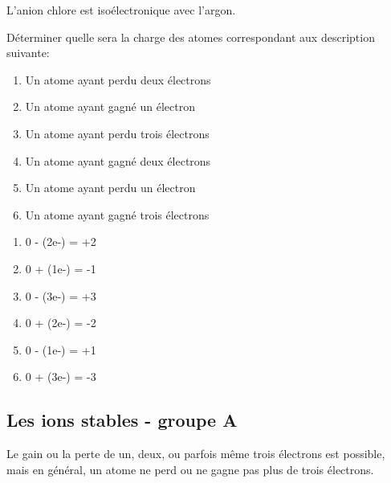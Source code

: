 \documentclass[
  11pt,
  a4paper,
  openany]{book}
\providecommand{\tightlist}{%
  \setlength{\itemsep}{0pt}\setlength{\parskip}{0pt}}
\begin{document}
L'anion chlore est isoélectronique avec l'argon.

\begin{Exercise}

Déterminer quelle sera la charge des atomes correspondant aux description suivante:

\begin{enumerate}
\def\labelenumi{\arabic{enumi}.}
\tightlist
\item
  Un atome ayant perdu deux électrons\\
\item
  Un atome ayant gagné un électron\\
\item
  Un atome ayant perdu trois électrons\\
\item
  Un atome ayant gagné deux électrons\\
\item
  Un atome ayant perdu un électron\\
\item
  Un atome ayant gagné trois électrons
\end{enumerate}

\end{Exercise}

\begin{Answer}

\begin{enumerate}
\def\labelenumi{\arabic{enumi}.}
\tightlist
\item
  0 - (2e-) = +2
\item
  0 + (1e-) = -1
\item
  0 - (3e-) = +3
\item
  0 + (2e-) = -2
\item
  0 - (1e-) = +1
\item
  0 + (3e-) = -3
\end{enumerate}

\newpage

\end{Answer}

\subsection{Les ions stables - groupe A}\label{les-ions-stables---groupe-a}

Le gain ou la perte de un, deux, ou parfois même trois électrons est possible, mais en général, un atome ne perd ou ne gagne pas plus de trois électrons.
\end{document}
